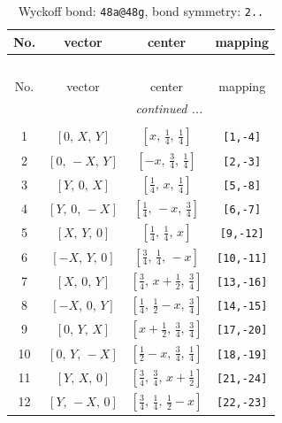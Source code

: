 \documentclass[fleqn,8pt]{jsarticle}
\begin{document}
\begin{longtable}{cccc}
\caption{Wyckoff bond: {\tt 48a@48g}, bond symmetry: {\tt 2..}}
 \\
 \hline \hline
No. & vector & center & mapping \\ \hline \endfirsthead

\multicolumn{3}{l}{\tablename\ \thetable{}} \\
 \hline \hline
No. & vector & center & mapping \\ \hline \endhead

 \hline \hline
\multicolumn{3}{r}{\footnotesize\it continued ...} \\ \endfoot

 \hline \hline
\multicolumn{3}{r}{} \\ \endlastfoot

1 & $\left[ 0,\, X,\, Y \right]$ & $\left[ x,\, \frac{1}{4},\, \frac{1}{4} \right]$ & {\tt [1,-4]} \\ \hline
2 & $\left[ 0,\, - X,\, Y \right]$ & $\left[ - x,\, \frac{3}{4},\, \frac{1}{4} \right]$ & {\tt [2,-3]} \\ \hline
3 & $\left[ Y,\, 0,\, X \right]$ & $\left[ \frac{1}{4},\, x,\, \frac{1}{4} \right]$ & {\tt [5,-8]} \\ \hline
4 & $\left[ Y,\, 0,\, - X \right]$ & $\left[ \frac{1}{4},\, - x,\, \frac{3}{4} \right]$ & {\tt [6,-7]} \\ \hline
5 & $\left[ X,\, Y,\, 0 \right]$ & $\left[ \frac{1}{4},\, \frac{1}{4},\, x \right]$ & {\tt [9,-12]} \\ \hline
6 & $\left[ - X,\, Y,\, 0 \right]$ & $\left[ \frac{3}{4},\, \frac{1}{4},\, - x \right]$ & {\tt [10,-11]} \\ \hline
7 & $\left[ X,\, 0,\, Y \right]$ & $\left[ \frac{3}{4},\, x + \frac{1}{2},\, \frac{3}{4} \right]$ & {\tt [13,-16]} \\ \hline
8 & $\left[ - X,\, 0,\, Y \right]$ & $\left[ \frac{1}{4},\, \frac{1}{2} - x,\, \frac{3}{4} \right]$ & {\tt [14,-15]} \\ \hline
9 & $\left[ 0,\, Y,\, X \right]$ & $\left[ x + \frac{1}{2},\, \frac{3}{4},\, \frac{3}{4} \right]$ & {\tt [17,-20]} \\ \hline
10 & $\left[ 0,\, Y,\, - X \right]$ & $\left[ \frac{1}{2} - x,\, \frac{3}{4},\, \frac{1}{4} \right]$ & {\tt [18,-19]} \\ \hline
11 & $\left[ Y,\, X,\, 0 \right]$ & $\left[ \frac{3}{4},\, \frac{3}{4},\, x + \frac{1}{2} \right]$ & {\tt [21,-24]} \\ \hline
12 & $\left[ Y,\, - X,\, 0 \right]$ & $\left[ \frac{3}{4},\, \frac{1}{4},\, \frac{1}{2} - x \right]$ & {\tt [22,-23]} \\
\end{longtable}
\end{document}

